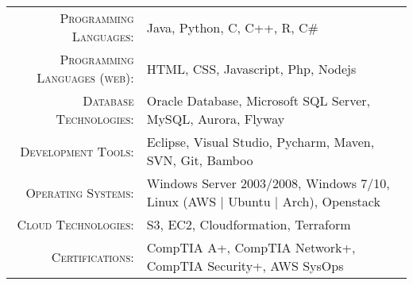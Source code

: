 %
%
%

\renewcommand{\arraystretch}{1.1}

	\begin{tabular}{>{}r>{}p{13cm}} 
		\textsc{Programming Languages:}  		&   Java, Python, C, C++, R, C\#\\
		\textsc{Programming Languages (web):}               	&   HTML, CSS,  Javascript, Php, Nodejs\\ 
		\textsc{Database Technologies:}                  &   Oracle Database, Microsoft SQL Server, MySQL, Aurora, Flyway \\ 
		\textsc{Development Tools:}	  		&   Eclipse, Visual Studio, Pycharm, Maven, SVN, Git, Bamboo\\
		\textsc{Operating Systems:}	        &   Windows Server 2003/2008, Windows 7/10,  Linux (AWS | Ubuntu | Arch), Openstack\\ 
		\textsc{Cloud Technologies:}        & S3, EC2, Cloudformation, Terraform\\
		\textsc{Certifications:}					        &  CompTIA A+, CompTIA Network+, CompTIA Security+, AWS SysOps
	
		
	\end{tabular} 